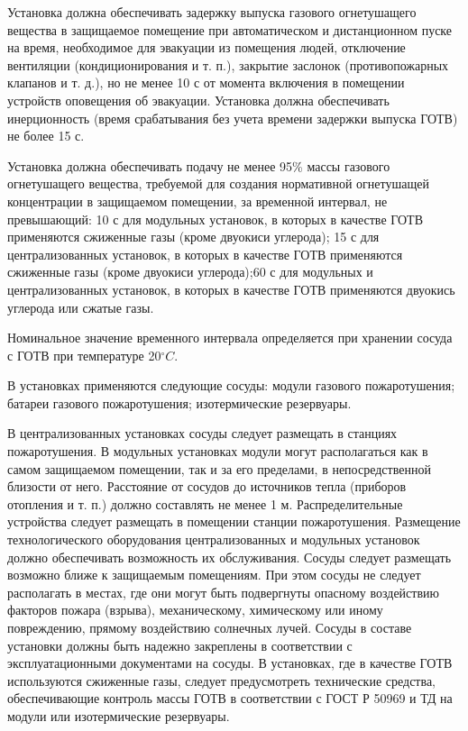 Установка должна обеспечивать задержку выпуска газового огнетушащего вещества в защищаемое помещение при автоматическом и
дистанционном пуске на время, необходимое для эвакуации из помещения людей, отключение вентиляции (кондиционирования и т. п.),
закрытие заслонок (противопожарных клапанов и т. д.), но не менее 10 с от момента включения в помещении устройств оповещения об
эвакуации. Установка должна обеспечивать инерционность (время срабатывания без учета времени задержки выпуска ГОТВ) не более 15 с.

Установка должна обеспечивать подачу не менее 95\% массы газового огнетушащего вещества, требуемой для создания нормативной
огнетушащей концентрации в защищаемом помещении, за временной интервал, не превышающий: 10 с для модульных установок, в которых
в качестве ГОТВ применяются сжиженные газы (кроме двуокиси углерода); 15 с для централизованных установок, в которых в качестве
ГОТВ применяются сжиженные газы (кроме двуокиси углерода);60 с для модульных и централизованных установок,
в которых в качестве ГОТВ применяются двуокись углерода или сжатые газы.

Номинальное значение временного интервала определяется при хранении сосуда с ГОТВ при температуре 20$^\circ{C}$.

В установках применяются следующие сосуды: модули газового пожаротушения; батареи газового пожаротушения; изотермические резервуары.

В централизованных установках сосуды следует размещать в станциях пожаротушения. В модульных установках модули могут располагаться как
в самом защищаемом помещении, так и за его пределами, в непосредственной близости от него. Расстояние от сосудов до источников
тепла (приборов отопления и т. п.) должно составлять не менее 1 м. Распределительные устройства следует размещать в помещении
станции пожаротушения. Размещение технологического оборудования централизованных и модульных установок должно обеспечивать
возможность их обслуживания. Сосуды следует размещать возможно ближе к защищаемым помещениям. При этом сосуды не следует
располагать в местах, где они могут быть подвергнуты опасному воздействию факторов пожара (взрыва), механическому, химическому
или иному повреждению, прямому воздействию солнечных лучей.
Сосуды в составе установки должны быть надежно закреплены в соответствии с эксплуатационными документами на сосуды.
В установках, где в качестве ГОТВ используются сжиженные газы, следует предусмотреть технические средства, обеспечивающие
контроль массы ГОТВ в соответствии с ГОСТ Р 50969 и ТД на модули или изотермические резервуары.

